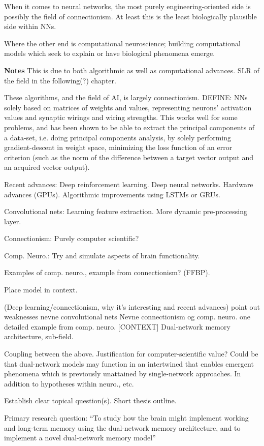 When it comes to neural networks, the most purely engineering-oriented side is possibly the field of connectionism. At least this is the least biologically plausible side within NNs.

Where the other end is computational neuroscience; building computational models which seek to explain or have biological phenomena emerge.



\textbf{Notes}
This is due to both algorithmic as well as computational advances. SLR of the field in the following(?) chapter.

These algorithms, and the field of AI, is largely connectionism. DEFINE: NNs solely based on matrices of weights and values, representing neurons' activation values and synaptic wirings and wiring strengths. This works well for some problems, and has been shown to be able to extract the principal components of a data-set, i.e. doing principal components analysis, by solely performing gradient-descent in weight space, minimizing the loss function of an error criterion (such as the norm of the difference between a target vector output and an acquired vector output).

Recent advances: Deep reinforcement learning. Deep neural networks. Hardware advances (GPUs). Algorithmic improvements using LSTMs or GRUs.

Convolutional nets: Learning feature extraction. More dynamic pre-processing layer.

Connectionism: Purely computer scientific?

Comp. Neuro.: Try and simulate aspects of brain functionality.

Examples of comp. neuro., example from connectionism? (FFBP).

Place model in context.



(Deep learning/connectionism, why it’s interesting and recent advances)
point out weaknesses
nevne convolutional nets
Nevne connectionism og comp. neuro.
one detailed example from comp. neuro. [CONTEXT]
Dual-network memory architecture, sub-field.

Coupling between the above. Justification for computer-scientific value? 
Could be that dual-network models may function in an intertwined that enables emergent phenomena which is previously unattained by single-network approaches. In addition to hypotheses within neuro., etc.

Establish clear topical question(s).
Short thesis outline.

Primary research question: “To study how the brain might implement working and long-term memory using the dual-network memory architecture, and to implement a novel dual-network memory model”


\cleardoublepage